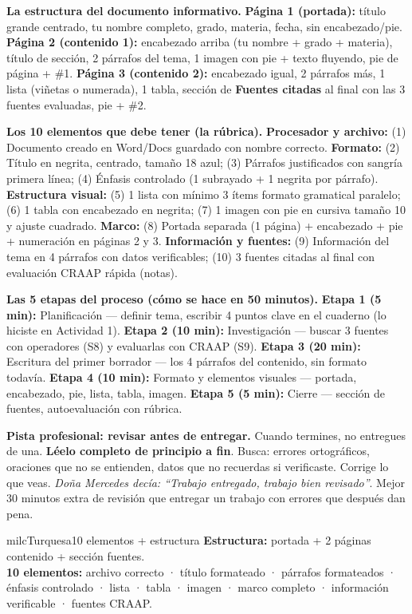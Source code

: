 \documentclass[11pt,letterpaper]{article}
\newcommand{\milcpaso}[3]{%
\Needspace{4\baselineskip}%
\begin{tcolorbox}[enhanced,colback=white,colframe=milcLinea,arc=1.5mm,boxrule=.9pt,
  left=14mm,right=4mm,top=3mm,bottom=3mm,before skip=4pt,after skip=4pt,
  fontupper=\RaggedRight,
  overlay={\node[anchor=north west,circle,fill=#2,text=white,inner sep=0pt,
    minimum size=7.4mm,font=\sffamily\bfseries\small]
    at ([xshift=3.6mm,yshift=-3.2mm]frame.north west) {#1};}]
#3
\end{tcolorbox}}
\begin{document}
\milcpaso{1}{milcTurquesa}{\textbf{La estructura del documento informativo.} \textbf{Página 1 (portada):} título grande centrado, tu nombre completo, grado, materia, fecha, sin encabezado/pie. \textbf{Página 2 (contenido 1):} encabezado arriba (tu nombre + grado + materia), título de sección, 2 párrafos del tema, 1 imagen con pie + texto fluyendo, pie de página + \#1. \textbf{Página 3 (contenido 2):} encabezado igual, 2 párrafos más, 1 lista (viñetas o numerada), 1 tabla, sección de \textbf{Fuentes citadas} al final con las 3 fuentes evaluadas, pie + \#2.}
\milcpaso{2}{milcTurquesa}{\textbf{Los 10 elementos que debe tener (la rúbrica).} \textbf{Procesador y archivo:} (1) Documento creado en Word/Docs guardado con nombre correcto. \textbf{Formato:} (2) Título en negrita, centrado, tamaño 18 azul; (3) Párrafos justificados con sangría primera línea; (4) Énfasis controlado (1 subrayado + 1 negrita por párrafo). \textbf{Estructura visual:} (5) 1 lista con mínimo 3 ítems formato gramatical paralelo; (6) 1 tabla con encabezado en negrita; (7) 1 imagen con pie en cursiva tamaño 10 y ajuste cuadrado. \textbf{Marco:} (8) Portada separada (1 página) + encabezado + pie + numeración en páginas 2 y 3. \textbf{Información y fuentes:} (9) Información del tema en 4 párrafos con datos verificables; (10) 3 fuentes citadas al final con evaluación CRAAP rápida (notas).}
\milcpaso{3}{milcTurquesa}{\textbf{Las 5 etapas del proceso (cómo se hace en 50 minutos).} \textbf{Etapa 1 (5 min):} Planificación --- definir tema, escribir 4 puntos clave en el cuaderno (lo hiciste en Actividad 1). \textbf{Etapa 2 (10 min):} Investigación --- buscar 3 fuentes con operadores (S8) y evaluarlas con CRAAP (S9). \textbf{Etapa 3 (20 min):} Escritura del primer borrador --- los 4 párrafos del contenido, sin formato todavía. \textbf{Etapa 4 (10 min):} Formato y elementos visuales --- portada, encabezado, pie, lista, tabla, imagen. \textbf{Etapa 5 (5 min):} Cierre --- sección de fuentes, autoevaluación con rúbrica.}
\milcpaso{4}{milcTurquesa}{\textbf{Pista profesional: revisar antes de entregar.} Cuando termines, no entregues de una. \textbf{Léelo completo de principio a fin}. Busca: errores ortográficos, oraciones que no se entienden, datos que no recuerdas si verificaste. Corrige lo que veas. \emph{Doña Mercedes decía: ``Trabajo entregado, trabajo bien revisado''}. Mejor 30 minutos extra de revisión que entregar un trabajo con errores que después dan pena.}

\begin{drawbox}{milcTurquesa}{10 elementos + estructura}
\textbf{Estructura:} portada + 2 páginas contenido + sección fuentes. \\[1mm]
\textbf{10 elementos:} archivo correcto · título formateado · párrafos formateados · énfasis controlado · lista · tabla · imagen · marco completo · información verificable · fuentes CRAAP.
\end{drawbox}
\end{document}
